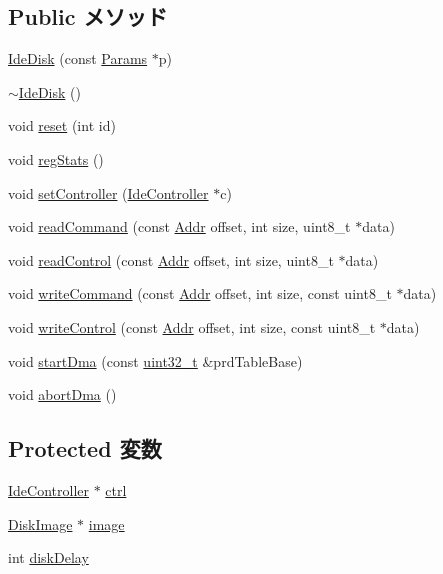 \subsection*{Public メソッド}
\begin{DoxyCompactItemize}
\item 
\hyperlink{classIdeDisk_a2e3da8ce499e288eefcec4c9bd396958}{IdeDisk} (const \hyperlink{classIdeDisk_a21c0f7d16893ae472d7dbbc6df963053}{Params} $\ast$p)
\item 
\hyperlink{classIdeDisk_ad8843ac1fd1bc4b6d82e57318c9aeb38}{$\sim$IdeDisk} ()
\item 
void \hyperlink{classIdeDisk_a28f0332a5e13753c3f831ce1772b50c7}{reset} (int id)
\item 
void \hyperlink{classIdeDisk_a4dc637449366fcdfc4e764cdf12d9b11}{regStats} ()
\item 
void \hyperlink{classIdeDisk_a2ffee462d2d9876fd5b3c6afc9a491bb}{setController} (\hyperlink{classIdeController}{IdeController} $\ast$c)
\item 
void \hyperlink{classIdeDisk_acf65df6ca6cb788da5cc36454d47cc34}{readCommand} (const \hyperlink{base_2types_8hh_af1bb03d6a4ee096394a6749f0a169232}{Addr} offset, int size, uint8\_\-t $\ast$data)
\item 
void \hyperlink{classIdeDisk_a9eb9bf3059a1fb59a282c5b86ad10ce6}{readControl} (const \hyperlink{base_2types_8hh_af1bb03d6a4ee096394a6749f0a169232}{Addr} offset, int size, uint8\_\-t $\ast$data)
\item 
void \hyperlink{classIdeDisk_af940c7b6408a2bb34bdd3580e8415da6}{writeCommand} (const \hyperlink{base_2types_8hh_af1bb03d6a4ee096394a6749f0a169232}{Addr} offset, int size, const uint8\_\-t $\ast$data)
\item 
void \hyperlink{classIdeDisk_af8e7a0d1414a2f9b03e2e001e036e87b}{writeControl} (const \hyperlink{base_2types_8hh_af1bb03d6a4ee096394a6749f0a169232}{Addr} offset, int size, const uint8\_\-t $\ast$data)
\item 
void \hyperlink{classIdeDisk_a5f7be8f129b212ec5a0f25ce5c65dbd7}{startDma} (const \hyperlink{Type_8hh_a435d1572bf3f880d55459d9805097f62}{uint32\_\-t} \&prdTableBase)
\item 
void \hyperlink{classIdeDisk_a477c235c4d75b02347129c86b67161ea}{abortDma} ()
\end{DoxyCompactItemize}
\subsection*{Protected 変数}
\begin{DoxyCompactItemize}
\item 
\hyperlink{classIdeController}{IdeController} $\ast$ \hyperlink{classIdeDisk_a15da11d9f856cf2edfc6ed93e24ad0ea}{ctrl}
\item 
\hyperlink{classDiskImage}{DiskImage} $\ast$ \hyperlink{classIdeDisk_a86d47120637a95e3a6876c774d768030}{image}
\item 
int \hyperlink{classIdeDisk_af49c4a1e28104d83429a5ae73e388143}{diskDelay}
\end{DoxyCompactItemize}
